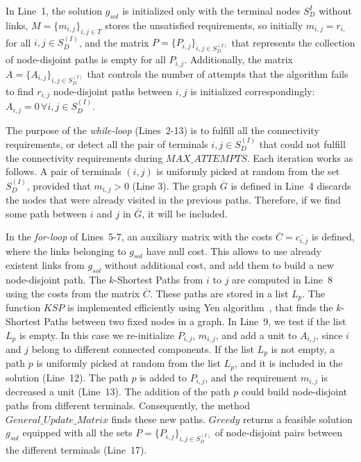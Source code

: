 In Line~1, the solution $g_{sol}$ is initialized only with the terminal nodes $S_{D}^{I}$ 
without links, $M=\{m_{i,j}\}_{i,j\in T}$ stores the unsatisfied requirements, 
so initially $m_{i,j}=r_{i,}$ for all $i,j\in S_{D}^{(I)}$, and 
the matrix $P=\{P_{i,j}\}_{i,j\in S_{D}^{(I)}}$ that represents the collection of 
node-disjoint paths is empty for all $P_{i,j}$. 
Additionally, the matrix $A=\{A_{i,j}\}_{i,j\in S_{D}^{(I)}}$  that controls 
the number of attempts that the algorithm fails to find $r_{i,j}$ node-disjoint paths 
between $i,j$ is initialized correspondingly: $A_{i,j}=0\, \forall i, j \in S_{D}^{(I)}$. 

The purpose of the \textit{while-loop} (Lines~2-13) is to fulfill all the connectivity 
requirements, or detect all the pair of terminals $i, j \in S_{D}^{(I)}$ that could 
not fulfill the connectivity requirements during $MAX\_ATTEMPTS$. Each iteration works as follows. 
A pair of terminals $(i,j)$ is uniformly picked at random from the set $S_{D}^{(I)}$, provided 
that $m_{i,j}>0$ (Line 3). The graph $\overline{G}$ is defined in Line~4 discards the nodes 
that were already visited in the previous paths. Therefore, if we find some path between $i$ and 
$j$ in $\overline{G}$, it will be included. 

In the \textit{for-loop} of Lines~5-7, an auxiliary matrix with the costs $\overline{C}=\overline{c_{i,j}}$ is defined, where the links belonging to $g_{sol}$ have null cost. 
This allows to use already existent links from $g_{sol}$ without additional cost, and add them to build a new node-disjoint path. The $k$-Shortest Paths from $i$ to $j$ are computed in Line~8 using the 
costs from the matrix $\overline{C}$. These paths are stored in a list $L_p$. The function $KSP$ 
is implemented efficiently using Yen algorithm~\cite{14}, that finds the $k$-Shortest Paths between two fixed nodes in a graph. In Line~9, we test if the list $L_p$ is empty. In this case we re-initialize 
$P_{i,j}$, $m_{i,j}$, and add a unit to $A_{i,j}$, since $i$ and $j$ belong to different connected components. If the list $L_p$ is not empty, a path $p$ is uniformly picked at random from the list $L_p$, 
and it is included in the solution (Line~12). The path $p$ is added to $P_{i,j}$, and the 
requirement $m_{i,j}$ is decreased a unit (Line~13). The addition of the path $p$ could 
build node-disjoint paths from different terminals. Consequently, the method $General\_Update\_Matrix$ 
finds these new paths. $Greedy$ returns a feasible solution $g_{sol}$ equipped with all the 
sets $P=\{P_{i,j}\}_{i,j \in S_{D}^{(I)}}$ of node-disjoint pairs between the different terminals 
(Line~17).\\

